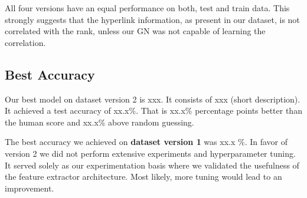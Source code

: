 All four versions have an equal performance on both, test and train data. This strongly suggests that the hyperlink information, as present in our dataset, is not correlated with the rank, unless our GN was not capable of learning the correlation.

\subsection{Best Accuracy}

Our best model on dataset version 2 is xxx. It consists of xxx (short description). It achieved a test accuracy of xx.x\%. That is xx.x\% percentage points better than the human score and xx.x\% above random guessing.

The best accuracy we achieved on \textbf{dataset version 1} was xx.x \%. In favor of version 2 we did not perform extensive experiments and hyperparameter tuning. It served solely as our experimentation basis where we validated the usefulness of the feature extractor architecture. Most likely, more tuning would lead to an improvement.

